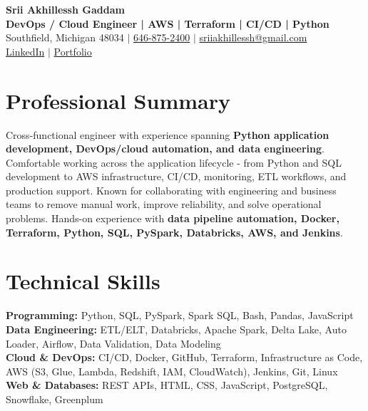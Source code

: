 \documentclass[letterpaper,10pt]{article}
\begin{document}
\fontsize{9.35pt}{10.45pt}\selectfont

\begin{center}
    {\LARGE \textbf{Srii Akhillessh Gaddam}} \\[-1pt]
    \textbf{DevOps / Cloud Engineer | AWS | Terraform | CI/CD | Python} \\[2pt]
    Southfield, Michigan 48034 $|$
    \href{tel:6468752400}{646-875-2400} $|$
    \href{mailto:sriiakhillessh@gmail.com}{sriiakhillessh@gmail.com} \\[1pt]
    \href{https://www.linkedin.com/in/srii-akhiilessh-gaddam-b48668191/}{LinkedIn} $|$
    \href{https://sriiakhillesshg.github.io/portfolio/}{Portfolio}
\end{center}
\vspace{-8pt}

\section{Professional Summary}
\small{Cross-functional engineer with experience spanning \textbf{Python application development, DevOps/cloud automation, and data engineering}. Comfortable working across the application lifecycle - from Python and SQL development to AWS infrastructure, CI/CD, monitoring, ETL workflows, and production support. Known for collaborating with engineering and business teams to remove manual work, improve reliability, and solve operational problems. Hands-on experience with \textbf{data pipeline automation, Docker, Terraform, Python, SQL, PySpark, Databricks, AWS, and Jenkins}.}

\section{Technical Skills}
\small{
\textbf{Programming:} Python, SQL, PySpark, Spark SQL, Bash, Pandas, JavaScript \\
\textbf{Data Engineering:} ETL/ELT, Databricks, Apache Spark, Delta Lake, Auto Loader, Airflow, Data Validation, Data Modeling \\
\textbf{Cloud \& DevOps:} CI/CD, Docker, GitHub, Terraform, Infrastructure as Code, AWS (S3, Glue, Lambda, Redshift, IAM, CloudWatch), Jenkins, Git, Linux \\
\textbf{Web \& Databases:} REST APIs, HTML, CSS, JavaScript, PostgreSQL, Snowflake, Greenplum
}
\end{document}
